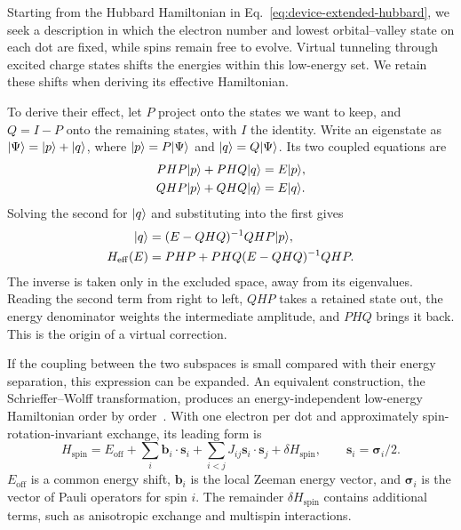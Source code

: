 Starting from the Hubbard Hamiltonian in
Eq.~\eqref{eq:device-extended-hubbard}, we seek a description in
which the electron number and lowest orbital--valley state on each
dot are fixed, while spins remain free to evolve.
Virtual tunneling through excited charge states shifts the
energies within this low-energy set. We retain these shifts
when deriving its effective Hamiltonian.

To derive their effect, let $P$ project onto the states we want
to keep, and $Q=I-P$ onto the remaining states, with $I$ the identity.
Write an eigenstate as
$\lvert \Psi\rangle=\lvert p\rangle+\lvert q\rangle$, where
$\lvert p\rangle=P\lvert \Psi\rangle$ and $\lvert q\rangle=Q\lvert \Psi\rangle$.
Its two coupled equations are
\begin{equation}
 \begin{aligned}
 PHP\ket p+PHQ\ket q&=E\ket p,\\
 QHP\ket p+QHQ\ket q&=E\ket q.
 \end{aligned}
 \label{eq:device-block-eigenproblem}
\end{equation}
Solving the second for $\lvert q\rangle$ and substituting into the first
gives
\begin{equation}
 \begin{aligned}
 \ket q&=(E-QHQ)^{-1}QHP\ket p,\\
 H_{\mathrm{eff}}(E)&=PHP+
                PHQ(E-QHQ)^{-1}QHP.
 \end{aligned}
 \label{eq:device-effective-resolvent}
\end{equation}
The inverse is taken only in the excluded space, away from its
eigenvalues. Reading the second term from right to left,
$QHP$ takes a retained state out, the energy denominator weights
the intermediate amplitude, and $PHQ$ brings it back.
This is the origin of a virtual correction.

If the coupling between the two subspaces is small compared
with their energy separation, this expression can be expanded.
An equivalent construction, the Schrieffer--Wolff transformation,
produces an energy-independent low-energy Hamiltonian
order by order~\cite{Bravyi2011}. With one electron per dot
and approximately spin-rotation-invariant exchange, its leading
form is
\begin{equation}
 H_{\mathrm{spin}}=E_{\mathrm{off}}
       +\sum_i\mathbf b_i\cdot\mathbf s_i
       +\sum_{i<j}J_{ij}\mathbf s_i\cdot\mathbf s_j
       +\delta H_{\mathrm{spin}},
 \qquad \mathbf s_i=\boldsymbol\sigma_i/2.
 \label{eq:device-spin-hamiltonian}
\end{equation}
$E_{\mathrm{off}}$ is a common energy shift,
$\mathbf b_i$ is the local Zeeman energy vector, and
$\boldsymbol\sigma_i$ is the vector of Pauli operators for spin $i$.
The remainder $\delta H_{\mathrm{spin}}$ contains additional terms,
such as anisotropic exchange and multispin interactions.

